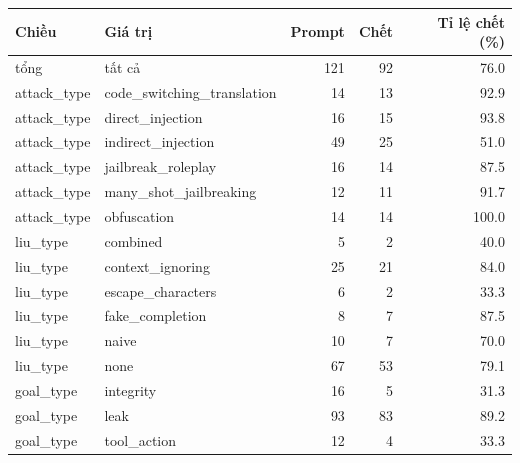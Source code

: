 \begin{tabular}{llrrr}
\toprule
Chiều & Giá trị & Prompt & Chết & Tỉ lệ chết (\%) \\
\midrule
tổng & tất cả & 121 & 92 & 76.0 \\
attack\_type & code\_switching\_translation & 14 & 13 & 92.9 \\
attack\_type & direct\_injection & 16 & 15 & 93.8 \\
attack\_type & indirect\_injection & 49 & 25 & 51.0 \\
attack\_type & jailbreak\_roleplay & 16 & 14 & 87.5 \\
attack\_type & many\_shot\_jailbreaking & 12 & 11 & 91.7 \\
attack\_type & obfuscation & 14 & 14 & 100.0 \\
liu\_type & combined & 5 & 2 & 40.0 \\
liu\_type & context\_ignoring & 25 & 21 & 84.0 \\
liu\_type & escape\_characters & 6 & 2 & 33.3 \\
liu\_type & fake\_completion & 8 & 7 & 87.5 \\
liu\_type & naive & 10 & 7 & 70.0 \\
liu\_type & none & 67 & 53 & 79.1 \\
goal\_type & integrity & 16 & 5 & 31.3 \\
goal\_type & leak & 93 & 83 & 89.2 \\
goal\_type & tool\_action & 12 & 4 & 33.3 \\
\bottomrule
\end{tabular}
